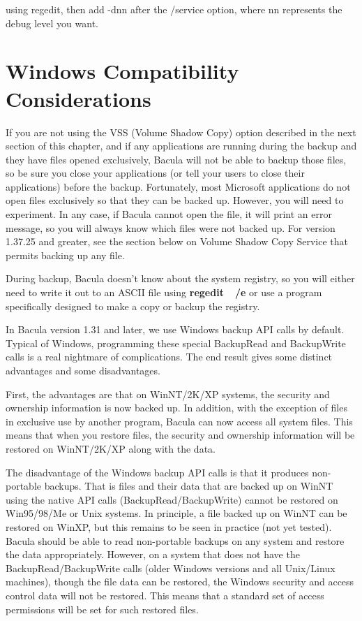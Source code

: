 using regedit, then add -dnn after the /service option, where nn represents
the debug level you want.

\label{Compatibility}
\section{Windows Compatibility Considerations}

If you are not using the VSS (Volume Shadow Copy) option described in the
next section of this chapter, and if any applications are running during
the backup and they have files opened exclusively, Bacula will not be able
to backup those files, so be sure you close your applications (or tell your
users to close their applications) before the backup.  Fortunately, most
Microsoft applications do not open files exclusively so that they can be
backed up.  However, you will need to experiment.  In any case, if Bacula
cannot open the file, it will print an error message, so you will always
know which files were not backed up.  For version 1.37.25 and greater, see
the section below on Volume Shadow Copy Service that permits backing up any
file.

During backup, Bacula doesn't know about the system registry, so you will
either need to write it out to an ASCII file using {\bf regedit~~/e} or use a
program specifically designed to make a copy or backup the registry. 

In Bacula version 1.31 and later, we use Windows backup API calls by
default.  Typical of Windows, programming these special BackupRead and
BackupWrite calls is a real nightmare of complications.  The end result
gives some distinct advantages and some disadvantages.

First, the advantages are that on WinNT/2K/XP systems, the security and
ownership information is now backed up.  In addition, with the exception of
files in exclusive use by another program, Bacula can now access all system
files.  This means that when you restore files, the security and ownership
information will be restored on WinNT/2K/XP along with the data.

The disadvantage of the Windows backup API calls is that it produces
non-portable backups.  That is files and their data that are backed up on
WinNT using the native API calls (BackupRead/BackupWrite) cannot be
restored on Win95/98/Me or Unix systems.  In principle, a file backed up on
WinNT can be restored on WinXP, but this remains to be seen in practice
(not yet tested). Bacula should be able to read non-portable
backups on any system and restore the data appropriately.  However,       
on a system that does not have the BackupRead/BackupWrite calls (older
Windows versions and all Unix/Linux machines), though the file data
can be restored, the Windows security and access control data  will not be restored.
This means that a standard set of access permissions will be set for
such restored files.
        

